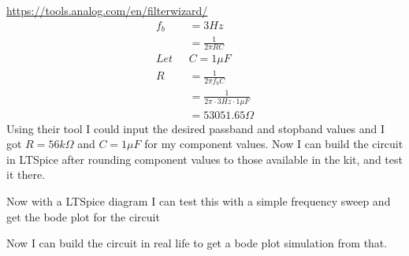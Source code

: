 \documentclass{article}
\begin{document}
\url{https://tools.analog.com/en/filterwizard/}
\begin{align}
    f_b &= 3Hz \\
    &= \frac{1}{2\pi RC}\\
    Let\text{ }&C = 1\mu F\\
    R &= \frac{1}{2\pi f_bC}\\
    &= \frac{1}{2\pi \cdot3Hz \cdot 1\mu F}\\
    &= 53051.65\Omega
\end{align}
Using their tool I could input the desired passband and stopband values and I got $R = 56k\Omega$ and $C = 1\mu F$ for my component values. Now I can build the circuit in LTSpice after rounding component values to those available in the kit, and test it there.
\begin{center}
\end{center}
Now with a LTSpice diagram I can test this with a simple frequency sweep and get the bode plot for the circuit
\begin{center}
\end{center}
Now I can build the circuit in real life to get a bode plot simulation from that.
\begin{center}
\end{center}
\end{document}
